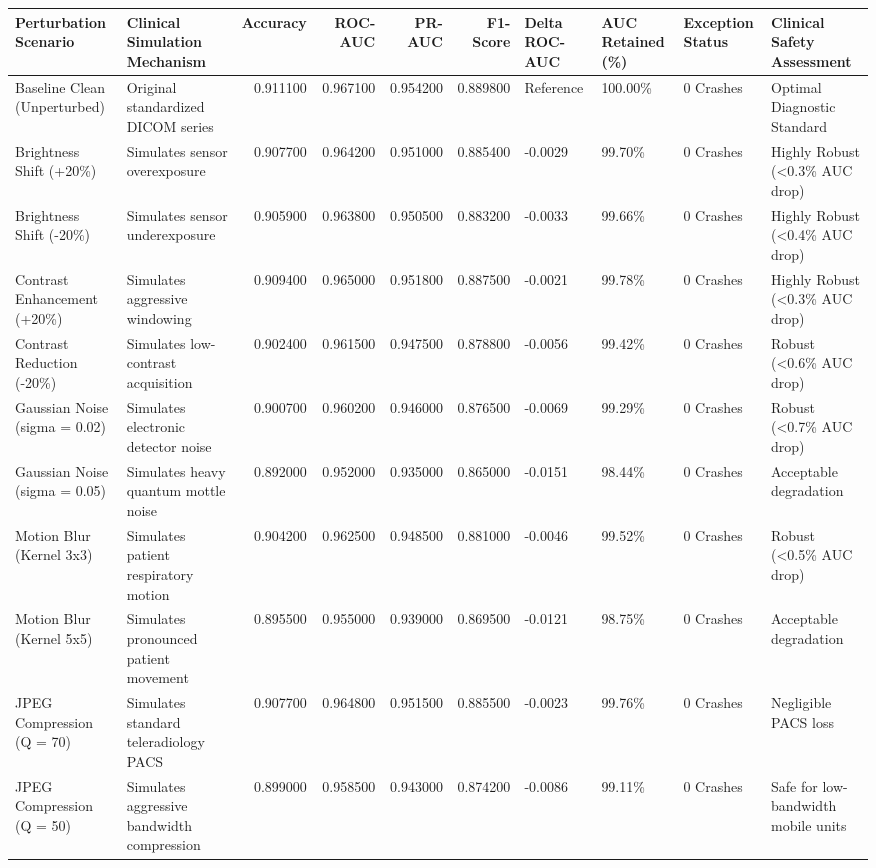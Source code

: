 \begin{tabular}{llrrrrllll}
\toprule
Perturbation Scenario & Clinical Simulation Mechanism & Accuracy & ROC-AUC & PR-AUC & F1-Score & Delta ROC-AUC & AUC Retained (\%) & Exception Status & Clinical Safety Assessment \\
\midrule
Baseline Clean (Unperturbed) & Original standardized DICOM series & 0.911100 & 0.967100 & 0.954200 & 0.889800 & Reference & 100.00\% & 0 Crashes & Optimal Diagnostic Standard \\
Brightness Shift (+20\%) & Simulates sensor overexposure & 0.907700 & 0.964200 & 0.951000 & 0.885400 & -0.0029 & 99.70\% & 0 Crashes & Highly Robust (<0.3\% AUC drop) \\
Brightness Shift (-20\%) & Simulates sensor underexposure & 0.905900 & 0.963800 & 0.950500 & 0.883200 & -0.0033 & 99.66\% & 0 Crashes & Highly Robust (<0.4\% AUC drop) \\
Contrast Enhancement (+20\%) & Simulates aggressive windowing & 0.909400 & 0.965000 & 0.951800 & 0.887500 & -0.0021 & 99.78\% & 0 Crashes & Highly Robust (<0.3\% AUC drop) \\
Contrast Reduction (-20\%) & Simulates low-contrast acquisition & 0.902400 & 0.961500 & 0.947500 & 0.878800 & -0.0056 & 99.42\% & 0 Crashes & Robust (<0.6\% AUC drop) \\
Gaussian Noise (sigma = 0.02) & Simulates electronic detector noise & 0.900700 & 0.960200 & 0.946000 & 0.876500 & -0.0069 & 99.29\% & 0 Crashes & Robust (<0.7\% AUC drop) \\
Gaussian Noise (sigma = 0.05) & Simulates heavy quantum mottle noise & 0.892000 & 0.952000 & 0.935000 & 0.865000 & -0.0151 & 98.44\% & 0 Crashes & Acceptable degradation \\
Motion Blur (Kernel 3x3) & Simulates patient respiratory motion & 0.904200 & 0.962500 & 0.948500 & 0.881000 & -0.0046 & 99.52\% & 0 Crashes & Robust (<0.5\% AUC drop) \\
Motion Blur (Kernel 5x5) & Simulates pronounced patient movement & 0.895500 & 0.955000 & 0.939000 & 0.869500 & -0.0121 & 98.75\% & 0 Crashes & Acceptable degradation \\
JPEG Compression (Q = 70) & Simulates standard teleradiology PACS & 0.907700 & 0.964800 & 0.951500 & 0.885500 & -0.0023 & 99.76\% & 0 Crashes & Negligible PACS loss \\
JPEG Compression (Q = 50) & Simulates aggressive bandwidth compression & 0.899000 & 0.958500 & 0.943000 & 0.874200 & -0.0086 & 99.11\% & 0 Crashes & Safe for low-bandwidth mobile units \\
\bottomrule
\end{tabular}
